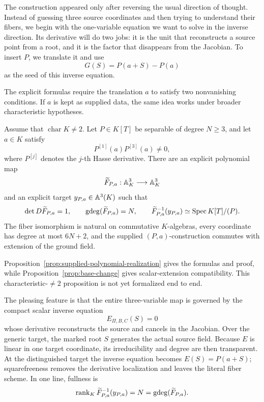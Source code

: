 The construction appeared only after reversing the usual direction of
thought.  Instead of guessing three source coordinates and then trying to
understand their fibers, we begin with the one-variable equation we want to
solve in the inverse direction.  Its derivative will do two jobs: it is the
unit that reconstructs a source point from a root, and it is the factor that
disappears from the Jacobian.  To insert \(P\), we translate it and use
\[
 G(S)=P(a+S)-P(a)
\]
as the seed of this inverse equation.

The explicit formulas require the translation \(a\) to satisfy two
nonvanishing conditions.  If \(a\) is kept as supplied data, the same idea
works under broader characteristic hypotheses.

\begin{proposition}\label{prop:supplied-intro}
Assume that \(\operatorname{char}K\neq2\).  Let \(P\in K[T]\) be separable
of degree \(N\geq3\), and let \(a\in K\) satisfy
\[
 P^{[1]}(a)P^{[3]}(a)\neq0,
\]
where \(P^{[j]}\) denotes the \(j\)-th Hasse derivative.  There are an
explicit polynomial map
\[
 \widetilde F_{P,a}:\mathbb A^3_K\longrightarrow\mathbb A^3_K
\]
and an explicit target \(y_{P,a}\in\mathbb A^3(K)\) such that
\[
 \det D\widetilde F_{P,a}=1,\qquad
 \operatorname{gdeg}(\widetilde F_{P,a})=N,\qquad
 \widetilde F_{P,a}^{-1}(y_{P,a})
 \simeq\operatorname{Spec} K[T]/(P).
\]
The fiber isomorphism is natural on commutative \(K\)-algebras, every
coordinate has degree at most \(6N+2\), and the supplied
\((P,a)\)-construction commutes with extension of the ground field.
\end{proposition}

Proposition~\ref{prop:supplied-polynomial-realization} gives the formulas and
proof, while Proposition~\ref{prop:base-change} gives scalar-extension
compatibility.  This characteristic-\(\ne2\) proposition is not yet
formalized end to end.

The pleasing feature is that the entire three-variable map is governed by
the compact scalar inverse equation
\[
 E_{\Pi,B,C}(S)=0
\]
whose derivative reconstructs the source and cancels in the Jacobian.  Over
the generic target, the marked root \(S\) generates the actual source field.
Because \(E\) is linear in one target coordinate, its irreducibility and
degree are then transparent.  At the distinguished target the inverse
equation becomes \(E(S)=P(a+S)\); squarefreeness removes the derivative
localization and leaves the literal fiber scheme.  In one line, fullness is
\[
 \operatorname{rank}_K\widetilde F_{P,a}^{-1}(y_{P,a})
 =N=\operatorname{gdeg}(\widetilde F_{P,a}).
\]

